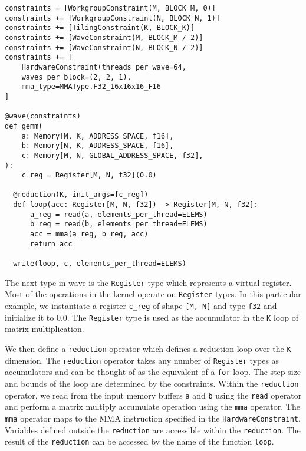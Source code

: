 \documentclass{article}
\begin{document}
\begin{lstlisting}[language=Wave, frame=single, breaklines, caption={Mixed-precision $C = A \times B^{T}$ expressed in Wave.}, captionpos=b, label={lst:gemm}]
constraints = [WorkgroupConstraint(M, BLOCK_M, 0)]
constraints += [WorkgroupConstraint(N, BLOCK_N, 1)]
constraints += [TilingConstraint(K, BLOCK_K)]
constraints += [WaveConstraint(M, BLOCK_M / 2)]
constraints += [WaveConstraint(N, BLOCK_N / 2)]
constraints += [
    HardwareConstraint(threads_per_wave=64,
    waves_per_block=(2, 2, 1),
    mma_type=MMAType.F32_16x16x16_F16
]

@wave(constraints)
def gemm(
    a: Memory[M, K, ADDRESS_SPACE, f16],
    b: Memory[N, K, ADDRESS_SPACE, f16],
    c: Memory[M, N, GLOBAL_ADDRESS_SPACE, f32],
):
    c_reg = Register[M, N, f32](0.0)

  @reduction(K, init_args=[c_reg])
  def loop(acc: Register[M, N, f32]) -> Register[M, N, f32]:
      a_reg = read(a, elements_per_thread=ELEMS)
      b_reg = read(b, elements_per_thread=ELEMS)
      acc = mma(a_reg, b_reg, acc)
      return acc

  write(loop, c, elements_per_thread=ELEMS)
\end{lstlisting}

The next type in wave is the \texttt{Register} type which represents a virtual
register. Most of the operations in the kernel operate on \texttt{Register} types.
In this particular example, we instantiate a register \texttt{c\_reg} of shape \texttt{[M, N]}
and type \texttt{f32} and initialize it to 0.0. The \texttt{Register} type is used as the accumulator in the \texttt{K} loop
of matrix multiplication.

We then define a \texttt{reduction} operator which defines a reduction loop over the
\texttt{K} dimension. The \texttt{reduction} operator takes any number of \texttt{Register} types as accumulators and
can be thought of as the equivalent of a \texttt{for} loop. The step size and bounds of the loop are determined by the
constraints. Within the \texttt{reduction} operator, we read from the input memory buffers \texttt{a} and \texttt{b} using
the \texttt{read} operator and perform a matrix multiply accumulate operation using the \texttt{mma} operator. The \texttt{mma}
operator maps to the MMA instruction specified in the \texttt{HardwareConstraint}. Variables defined outside the \texttt{reduction}
are accessible within the \texttt{reduction}. The result of the \texttt{reduction} can be accessed by the name of the function \texttt{loop}.
\end{document}
